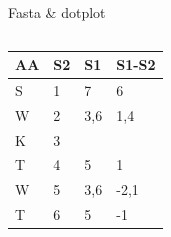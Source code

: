 \documentclass[pdf]{beamer}
\begin{document}
\begin{frame}[fragile]{Fasta \& dotplot}
  \begin{columns}
    \begin{column}{0.5\textwidth}
      {\small
        \setlength{\tabcolsep}{0.5em}
        \begin{tabular}{l|ll|l}
          AA & S2 & S1 & S1-S2 \\
          \hline
          S & 1 & 7 & 6\\
          W & 2 & 3,6 & 1,4\\
          K & 3 & & \\
          T & 4 & 5 & 1\\
          W & 5 & 3,6 & -2,1\\
          T & 6 & 5 & -1\\
        \end{tabular}
      }
    \end{column}
    \begin{column}{0.5\textwidth}
      \begin{figure}[ht]
        \begin{tikzpicture}[scale=0.5]
          
        \end{tikzpicture}
      \end{figure}
    \end{column}
  \end{columns}

\vspace{1em}

\end{frame}
\end{document}
